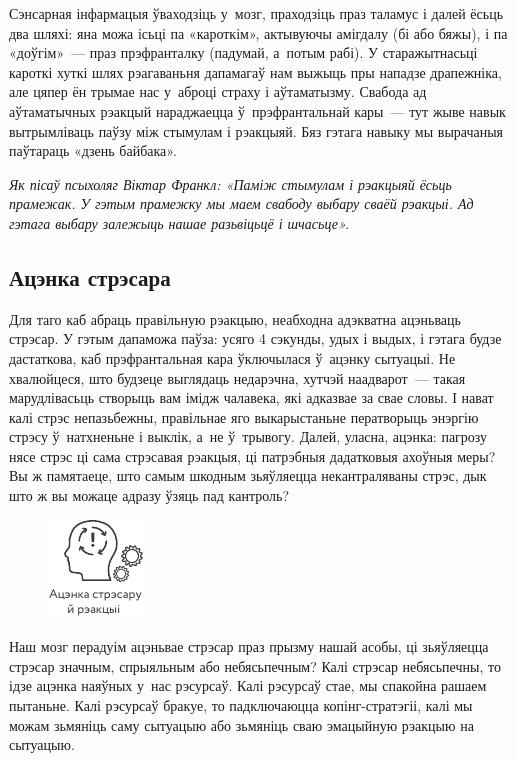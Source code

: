 Сэнсарная інфармацыя ўваходзіць у~мозг, праходзіць праз таламус і далей ёсьць два шляхі: яна можа ісьці па «кароткім», актывуючы амігдалу (бі або бяжы), і па «доўгім»~--- праз прэфранталку (падумай, а~потым рабі). У старажытнасьці кароткі хуткі шлях рэагаваньня дапамагаў нам выжыць пры нападзе драпежніка, але цяпер ён трымае нас у~аброці страху і аўтаматызму. Свабода ад аўтаматычных рэакцый нараджаецца ў~прэфрантальнай кары~--- тут жыве навык вытрымліваць паўзу між стымулам і рэакцыяй. Бяз гэтага навыку мы вырачаныя паўтараць «дзень байбака».

\emph{Як пісаў псыхоляг Віктар Франкл: «Паміж стымулам і рэакцыяй ёсьць прамежак. У гэтым прамежку мы маем свабоду выбару сваёй рэакцыі. Ад гэтага выбару залежыць нашае разьвіцьцё і шчасьце».}

\subsection*{Ацэнка стрэсара}

Для таго каб абраць правільную рэакцыю, неабходна адэкватна ацэньваць стрэсар. У гэтым дапаможа паўза: усяго 4 сэкунды, удых і выдых, і гэтага будзе дастаткова, каб прэфрантальная кара ўключылася ў~ацэнку сытуацыі. Не хвалюйцеся, што будзеце выглядаць недарэчна, хутчэй наадварот~--- такая марудлівасьць створыць вам імідж чалавека, які адказвае за свае словы. І нават калі стрэс непазьбежны, правільнае яго выкарыстаньне ператворыць энэргію стрэсу ў~натхненьне і выклік, а~не ў~трывогу. Далей, уласна, ацэнка: пагрозу нясе стрэс ці сама стрэсавая рэакцыя, ці патрэбныя дадатковыя ахоўныя меры? Вы ж памятаеце, што самым шкодным зьяўляецца некантраляваны стрэс, дык што ж вы можаце адразу ўзяць пад кантроль?

\begin{figure}[htb!]
  \centering
  \includegraphics[scale=1.5]{willpower/ch7/12.pdf}
\end{figure}

Наш мозг перадуім ацэньвае стрэсар праз прызму нашай асобы, ці зьяўляецца стрэсар значным, спрыяльным або небясьпечным? Калі стрэсар небясьпечны, то ідзе ацэнка наяўных у~нас рэсурсаў. Калі рэсурсаў стае, мы спакойна рашаем пытаньне. Калі рэсурсаў бракуе, то падключаюцца копінг-стратэгіі, калі мы можам зьмяніць саму сытуацыю або зьмяніць сваю эмацыйную рэакцыю на сытуацыю.

